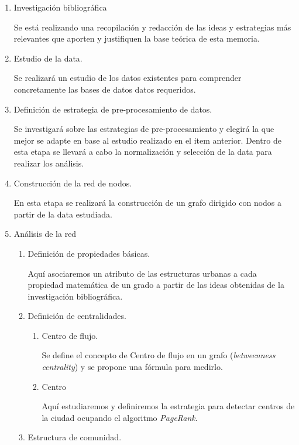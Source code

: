 \documentclass[12pt]{article}
\begin{document}
    \begin{enumerate}
    \item Investigación bibliográfica

    Se está realizando una recopilación y redacción de las ideas y estrategias más relevantes que aporten y justifiquen la base teórica de esta memoria.

    \item Estudio de la data.

    Se realizará un estudio de los datos existentes para comprender concretamente las bases de datos datos requeridos.  

    \item Definición de estrategia de pre-procesamiento de datos.

    Se investigará sobre las estrategias de pre-procesamiento y elegirá la que mejor se adapte en base al estudio realizado en el item anterior. Dentro de esta etapa se llevará a cabo la normalización y selección de la data para realizar los análisis.

    \item Construcción de la red de nodos.

    En esta etapa se realizará la construcción de un grafo dirigido con nodos a partir de la data estudiada.

    \item Análisis de la red
    \begin{enumerate}
    \item Definición de propiedades básicas.

    Aquí asociaremos un atributo de las estructuras urbanas a cada propiedad matemática de un grado a partir de las ideas obtenidas de la investigación bibliográfica.

    \item Definición de centralidades.
    \begin{enumerate}
    \item Centro de flujo.

    Se define el concepto de Centro de flujo en un grafo (\textit{betweenness centrality}) y se propone una fórmula para medirlo.

    \item Centro

    Aquí estudiaremos y definiremos la estrategia para detectar centros de la ciudad ocupando el algoritmo \textit{PageRank}.

    \end{enumerate}
    \item Estructura de comunidad.


\end{enumerate}
\end{enumerate}
\end{document}
